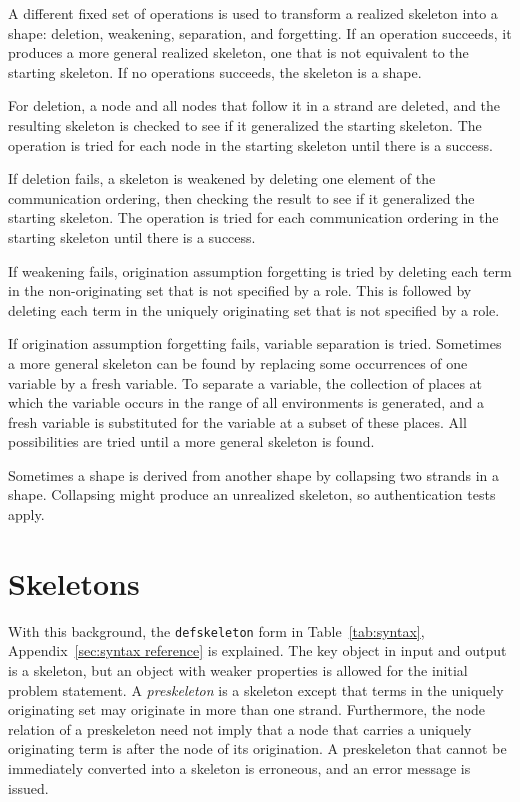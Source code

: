 \documentclass[12pt]{article}
\begin{document}
A different fixed set of operations is used to transform a realized
skeleton into a shape: deletion, weakening, separation, and
forgetting.  If an operation succeeds, it produces a more general
realized skeleton, one that is not equivalent to the starting
skeleton.  If no operations succeeds, the skeleton is a shape.

For deletion, a node and all nodes that follow it in a strand are
deleted, and the resulting skeleton is checked to see if it
generalized the starting skeleton.  The operation is tried for each
node in the starting skeleton until there is a success.

If deletion fails, a skeleton is weakened by deleting one element of
the communication ordering, then checking the result to see if it
generalized the starting skeleton.  The operation is tried for each
communication ordering in the starting skeleton until there is a success.

If weakening fails, origination assumption forgetting is tried by
deleting each term in the non-originating set that is not
specified by a role.  This is followed by deleting each term in the
uniquely originating set that is not specified by a role.

If origination assumption forgetting fails, variable separation is
tried.  Sometimes a more general skeleton can be found by replacing
some occurrences of one variable by a fresh variable.  To separate a
variable, the collection of places at which the variable occurs in the
range of all environments is generated, and a fresh variable is
substituted for the variable at a subset of these places.  All
possibilities are tried until a more general skeleton is found.

Sometimes a shape is derived from another shape by collapsing two
strands in a shape.  Collapsing might produce an unrealized skeleton,
so authentication tests apply.

\section{Skeletons}\label{sec:skeletons}

With this background, the \texttt{defskeleton} form in
Table~\ref{tab:syntax}, Appendix~\ref{sec:syntax reference} is
explained.  The key object in {\cpsa} input and output is a skeleton,
but an object with weaker properties is allowed for the initial
problem statement.  A \emph{preskeleton} is a
skeleton except that terms in the uniquely originating set may
originate in more than one strand.  Furthermore, the node relation of
a preskeleton need not imply that a node that carries a uniquely
originating term is after the node of its origination.  A preskeleton
that cannot be immediately converted into a skeleton is erroneous, and
an error message is issued.
\end{document}
